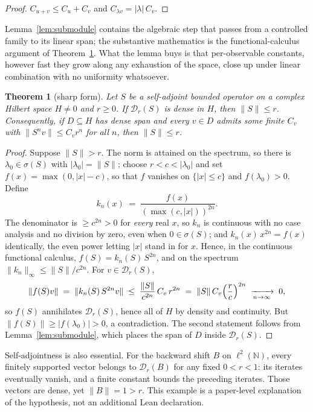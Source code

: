 \documentclass[11pt]{article}
\newtheorem{theorem}{Theorem}[section]
\theoremstyle{definition}
\begin{document}
\begin{proof}
$C_{u+v} \le C_u + C_v$ and $C_{\lambda v} = |\lambda|\,C_v$.
\end{proof}

Lemma~\ref{lem:submodule} contains the algebraic step that passes from a
controlled family to its linear span; the substantive mathematics is the
functional-calculus argument of Theorem~\ref{thm:sharp}.  What the lemma
buys is that
per-observable constants, however fast they grow along any exhaustion of
the space, close up under linear combination with no uniformity
whatsoever.

\begin{theorem}[sharp form]
\label{thm:sharp}
Let $S$ be a self-adjoint bounded operator on a complex Hilbert space
$H \neq 0$ and $r \ge 0$.  If $\mathcal{D}_r(S)$ is dense in $H$, then
$\|S\| \le r$.  Consequently, if $D \subseteq H$ has dense span and every
$v \in D$ admits some finite $C_v$ with $\|S^n v\| \le C_v r^n$ for all
$n$, then $\|S\| \le r$.
\end{theorem}

\begin{proof}
Suppose $\|S\| > r$.  The norm is attained on the spectrum, so there is
$\lambda_0 \in \sigma(S)$ with $|\lambda_0| = \|S\|$; choose
$r < c < |\lambda_0|$ and set $f(x) = \max(0, |x| - c)$, so that $f$
vanishes on $\{|x| \le c\}$ and $f(\lambda_0) > 0$.  Define
\[
  k_n(x) \;=\; \frac{f(x)}{(\max(c,|x|))^{2n}} .
\]
The denominator is $\ge c^{2n} > 0$ for \emph{every} real $x$, so $k_n$
is continuous with no case analysis and no division by zero, even when
$0 \in \sigma(S)$; and $k_n(x)\,x^{2n} = f(x)$ identically, the even
power letting $|x|$ stand in for $x$.  Hence, in the continuous
functional calculus, $f(S) = k_n(S)\,S^{2n}$, and on the spectrum
$\|k_n\|_\infty \le \|S\|/c^{2n}$.  For $v \in \mathcal{D}_r(S)$,
\[
  \|f(S)v\| \;=\; \|k_n(S)\,S^{2n}v\|
  \;\le\; \frac{\|S\|}{c^{2n}}\,C_v\,r^{2n}
  \;=\; \|S\|\,C_v \Bigl(\frac{r}{c}\Bigr)^{2n}
  \;\xrightarrow[n\to\infty]{}\; 0 ,
\]
so $f(S)$ annihilates $\mathcal{D}_r(S)$, hence all of $H$ by density and
continuity.  But $\|f(S)\| \ge |f(\lambda_0)| > 0$, a contradiction.  The
second statement follows from Lemma~\ref{lem:submodule}, which places the
span of $D$ inside $\mathcal{D}_r(S)$.
\end{proof}

Self-adjointness is also essential.  For the backward shift $B$ on
$\ell^2(\mathbb N)$, every finitely supported vector belongs to
$\mathcal D_r(B)$ for any fixed $0<r<1$: its iterates eventually vanish,
and a finite constant bounds the preceding iterates.  Those vectors are
dense, yet $\|B\|=1>r$.  This example is a paper-level explanation of the
hypothesis, not an additional Lean declaration.
\end{document}
